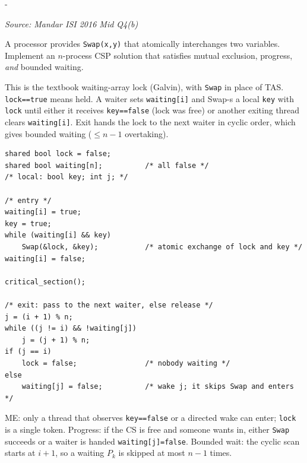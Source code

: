 \documentclass[11pt,a4paper]{article}
\makeatletter
\newcommand{\keepspace}[1]{\par\penalty-100\begingroup
  \setlength{\dimen@}{#1}\dimen@ii\pagegoal\advance\dimen@ii-\pagetotal
  \ifdim\dimen@>\dimen@ii\ifdim\dimen@ii>\z@\vfil\fi\break\fi\endgroup}
\newcounter{qn}[section]
\newenvironment{Qn}[4]{%
  \refstepcounter{qn}\keepspace{7\baselineskip}%
  \begin{tcolorbox}[qboxstyle, title={Q\thesection.\theqn\ \ [#1 \textbar\ #2]\ \ #4}]%
  {\footnotesize\color{g3}\textit{Source: #3}}\par\smallskip%
}{%
  \end{tcolorbox}%
}
\newenvironment{Sol}{%
  \begin{tcolorbox}[sboxstyle, title={Solution}]%
}{%
  \end{tcolorbox}\vspace{0.35em}%
}
\makeatother
\begin{document}
\begin{Qn}{Hard}{Lect 17}{Mandar ISI 2016 Mid Q4(b)}{\texttt{Swap} solution for the $n$-process CSP, including bounded waiting}
A processor provides \texttt{Swap(x,y)} that atomically interchanges two variables. Implement an $n$-process CSP solution that satisfies mutual exclusion, progress, \emph{and} bounded waiting.
\end{Qn}
\begin{Sol}
This is the textbook waiting-array lock (Galvin), with \texttt{Swap} in place of TAS. \texttt{lock==true} means held. A waiter sets \texttt{waiting[i]} and Swap-s a local \texttt{key} with \texttt{lock} until either it receives \texttt{key==false} (lock was free) or another exiting thread clears \texttt{waiting[i]}. Exit hands the lock to the next waiter in cyclic order, which gives bounded waiting ($\le n-1$ overtaking).

\begin{lstlisting}[numbers=none]
shared bool lock = false;
shared bool waiting[n];          /* all false */
/* local: bool key; int j; */

/* entry */
waiting[i] = true;
key = true;
while (waiting[i] && key)
    Swap(&lock, &key);           /* atomic exchange of lock and key */
waiting[i] = false;

critical_section();

/* exit: pass to the next waiter, else release */
j = (i + 1) % n;
while ((j != i) && !waiting[j])
    j = (j + 1) % n;
if (j == i)
    lock = false;                /* nobody waiting */
else
    waiting[j] = false;          /* wake j; it skips Swap and enters */
\end{lstlisting}

ME: only a thread that observes \texttt{key==false} or a directed wake can enter; \texttt{lock} is a single token. Progress: if the CS is free and someone wants in, either \texttt{Swap} succeeds or a waiter is handed \texttt{waiting[j]=false}. Bounded wait: the cyclic scan starts at $i+1$, so a waiting $P_k$ is skipped at most $n-1$ times.
\end{Sol}
\end{document}
